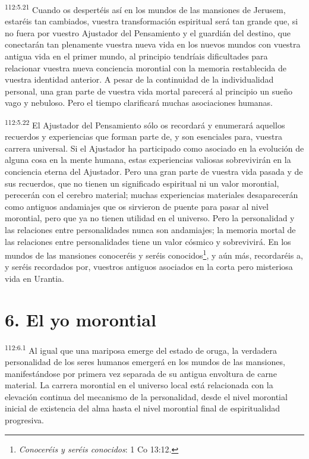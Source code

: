 \documentclass[twoside, 11pt]{book}
\begin{document}
\par
\textsuperscript{112:5.21} Cuando os despertéis así en los mundos de las mansiones de Jerusem, estaréis tan cambiados, vuestra transformación espiritual será tan grande que, si no fuera por vuestro Ajustador del Pensamiento y el guardián del destino, que conectarán tan plenamente vuestra nueva vida en los nuevos mundos con vuestra antigua vida en el primer mundo, al principio tendríais dificultades para relacionar vuestra nueva conciencia morontial con la memoria restablecida de vuestra identidad anterior. A pesar de la continuidad de la individualidad personal, una gran parte de vuestra vida mortal parecerá al principio un sueño vago y nebuloso. Pero el tiempo clarificará muchas asociaciones humanas.

\par
\textsuperscript{112:5.22} El Ajustador del Pensamiento sólo os recordará y enumerará aquellos recuerdos y experiencias que forman parte de, y son esenciales para, vuestra carrera universal. Si el Ajustador ha participado como asociado en la evolución de alguna cosa en la mente humana, estas experiencias valiosas sobrevivirán en la conciencia eterna del Ajustador. Pero una gran parte de vuestra vida pasada y de sus recuerdos, que no tienen un significado espiritual ni un valor morontial, perecerán con el cerebro material; muchas experiencias materiales desaparecerán como antiguos andamiajes que os sirvieron de puente para pasar al nivel morontial, pero que ya no tienen utilidad en el universo. Pero la personalidad y las relaciones entre personalidades nunca son andamiajes; la memoria mortal de las relaciones entre personalidades tiene un valor cósmico y sobrevivirá. En los mundos de las mansiones conoceréis y seréis conocidos\footnote{\textit{Conoceréis y seréis conocidos}: 1 Co 13:12.}, y aún más, recordaréis a, y seréis recordados por, vuestros antiguos asociados en la corta pero misteriosa vida en Urantia.

\section*{6. El yo morontial}
\par
\textsuperscript{112:6.1} Al igual que una mariposa emerge del estado de oruga, la verdadera personalidad de los seres humanos emergerá en los mundos de las mansiones, manifestándose por primera vez separada de su antigua envoltura de carne material. La carrera morontial en el universo local está relacionada con la elevación continua del mecanismo de la personalidad, desde el nivel morontial inicial de existencia del alma hasta el nivel morontial final de espiritualidad progresiva.
\end{document}
